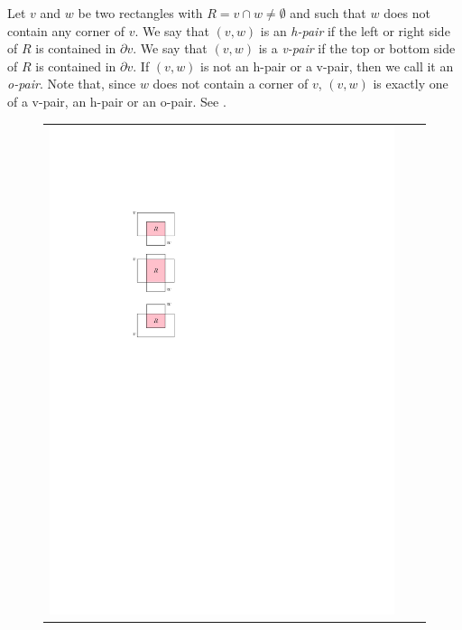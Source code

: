 \documentclass[lotsofwhite]{patmorin}
\begin{document}
Let $v$ and $w$ be two rectangles with $R=v\cap w\neq \emptyset$ and
such that $w$ does not contain any corner of $v$.  We say that $(v,w)$
is an \emph{h-pair} if the left or right side of $R$ is contained in
$\partial v$.  We say that $(v,w)$ is a \emph{v-pair} if the top or bottom
side of $R$ is contained in $\partial v$.  If $(v,w)$ is not an h-pair
or a v-pair, then we call it an \emph{o-pair}.  Note that, since $w$
does not contain a corner of $v$, $(v,w)$ is exactly one of a v-pair,
an h-pair or an o-pair. See .

\begin{figure}
   \begin{tabular}{ccc}
   \includegraphics{figs/hvo-1} & 

\end{tabular}
\end{figure}
\end{document}
